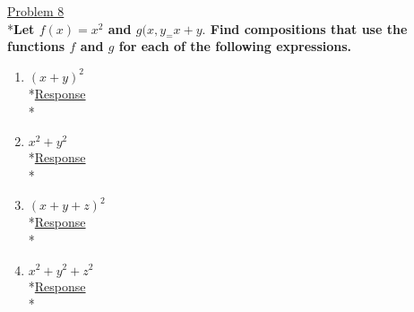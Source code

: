 \documentclass[12pt]{article}
\begin{document}
\medskip
\uline{Problem 8}
\\*\textbf{Let $f(x) = x^2$ and $g(x,y_ = x + y.$ Find compositions that use the functions $f$ and $g$ for each of the following expressions.}
\begin{enumerate}
\item $(x+y)^2$
\smallskip
\\*\uline{Response}
\\*
\item $x^2 + y^2$
\smallskip
\\*\uline{Response}
\\*
\item $(x+y+z)^2$
\smallskip
\\*\uline{Response}
\\*
\item $x^2+y^2+z^2$
\smallskip
\\*\uline{Response}
\\*
\end{enumerate}
\end{document}
